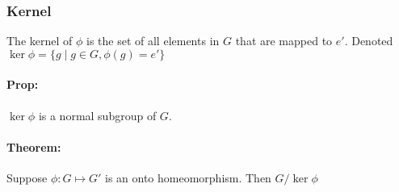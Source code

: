 \documentclass[11pt, letterpaper]{article}
\begin{document}
\subsubsection{Kernel}
	The kernel of $\phi$ is the set of all elements in $G$ that are mapped to $e'$.
	Denoted $\ker \phi = \{ g \mid g \in G, \phi(g) = e' \} $

\paragraph{Prop: }
$\ker \phi$ is a normal subgroup of $G$.

\paragraph{Theorem: }
	Suppose $\phi: G \mapsto G'$ is an onto homeomorphism.
	Then $G/\ker\phi $
\end{document}
